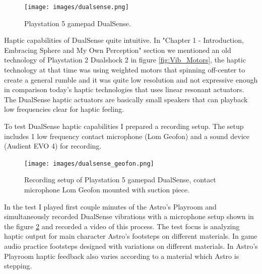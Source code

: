                 \begin{figure}[H]
                    \centering
                    \texttt{[image: images/dualsense.png]}
                    \caption{Playstation 5 gamepad DualSense.}
                    \label{fig:DUALSENSE}
                \end{figure}

                Haptic capabilities of DualSense quite intuitive. In "Chapter 1 - Introduction, Embracing Sphere and My Own Perception" section we mentioned an old technology of Playstation 2 Dualshock 2 in figure \ref{fig:Vib_Motors}, the haptic technology at that time was using weighted motors that spinning off-center to create a general rumble and it was quite low resolution and not expressive enough in comparison today's haptic technologies that uses linear resonant actuators\cite{Audio-Tactile_Rendering}. The DualSense haptic actuators are basically small speakers that can playback low frequencies clear for haptic feeling.\par

                To test DualSense haptic capabilities I prepared a recording setup. The setup includes 1 low frequency contact microphone (Lom Geofon) and a sound device (Audient EVO 4) for recording.\par

                \begin{figure}[H]
                    \centering
                    \texttt{[image: images/dualsense\_geofon.png]}
                    \caption{Recording setup of Playstation 5 gamepad DualSense, contact microphone Lom Geofon mounted with suction piece.}
                    \label{fig:DUALSENSE_GEOFON}
                \end{figure}

                In the test I played first couple minutes of the Astro's Playroom and simultaneously recorded DualSense vibrations with a microphone setup shown in the figure \ref{fig:DUALSENSE_GEOFON} and recorded a video of this process. The test focus is analyzing haptic output for main character Astro's footsteps on different materials. In game audio practice footsteps designed with variations on different materials\cite{Princibles_of_Game_Audio_and_Sound_Design}. In Astro's Playroom haptic feedback also varies according to a material which Astro is stepping.\par

